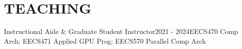 \section{TEACHING}
    \resumeSubHeadingListStart
        \resumeSubheading
        {Instructional Aide \& Graduate Student Instructor}{2021 - 2024}{EECS470 Comp Arch; EECS471 Applied GPU Prog; EECS570 Parallel Comp Arch}{}
            
    \resumeSubHeadingListEnd
